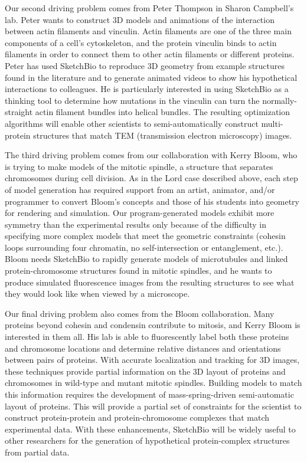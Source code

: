 \documentclass[twocolumn]{bmcart}%
\begin{document}
Our second driving problem comes from Peter Thompson in Sharon Campbell's lab.
Peter wants to construct 3D models and animations of the interaction between actin filaments and vinculin.
Actin filaments are one of the three main components of a cell's cytoskeleton, and the protein vinculin binds to actin filaments in order to connect them to other actin filaments or different proteins.
Peter has used SketchBio to reproduce 3D geometry from example structures found in the literature and to generate animated videos to show his hypothetical interactions to colleagues.
He is particularly interested in using SketchBio as a thinking tool to determine how mutations in the vinculin can turn the normally-straight actin filament bundles into helical bundles.
The resulting optimization algorithms will enable other scientists to semi-automatically construct multi-protein structures that match TEM (transmission electron microscopy) images.

The third driving problem comes from our collaboration with Kerry Bloom, who is trying to make models of the mitotic spindle, a structure that separates chromosomes during cell division.
As in the Lord case described above, each step of model generation has required support from an artist, animator, and/or programmer to convert Bloom's concepts and those of his students into geometry for rendering and simulation.
Our program-generated models exhibit more symmetry than the experimental results only because of the difficulty in specifying more complex models that meet the geometric constraints (cohesin loops surrounding four chromatin, no self-intersection or entanglement, etc.).
Bloom needs SketchBio to rapidly generate models of microtubules and linked protein-chromosome structures found in mitotic spindles, and he wants to produce simulated fluorescence  images from the resulting structures to see what they would look like when viewed by a microscope.

Our final driving problem also comes from the Bloom collaboration.
Many proteins beyond cohesin and condensin contribute to mitosis, and Kerry Bloom is interested in them all.  His lab is able to fluorescently label both these proteins and chromosome locations and determine relative distances and orientations between pairs of proteins.
With accurate localization and tracking for 3D images, these techniques provide partial information on the 3D layout of proteins and chromosomes in wild-type and mutant mitotic spindles.
Building models to match this information requires the development of mass-spring-driven semi-automatic layout of proteins.
This will provide a partial set of constraints for the scientist to construct protein-protein and protein-chromosome complexes that match experimental data.
With these enhancements, SketchBio will be widely useful to other researchers for the generation of hypothetical protein-complex structures from partial data.
\end{document}
